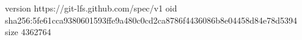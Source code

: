 version https://git-lfs.github.com/spec/v1
oid sha256:5fe61cca9380601593ffe9a480c0cd2ca8786f4436086b8e04458d84e78d5394
size 4362764
